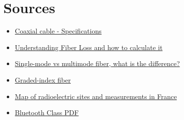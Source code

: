 \documentclass[12]{article}
\begin{document}
\newpage
\section*{Sources}

\begin{itemize}{\textwidth}
    \item [$\bullet$] \href{http://f5ad.free.fr/ANT-QSP_F5AD_Pertes-ROS-cable-coaxial.htm}{Coaxial cable - Specifications}

    \item [$\bullet$] \href{https://community.fs.com/fr/article/understanding-fiber-loss-what-is-it-and-how-to-calculate-it.html}{Understanding Fiber Loss and how to calculate it}

    \item [$\bullet$] \href{https://www.optcore.net/fr/single-mode-vs-multimode-fiber-difference/}{Single-mode vs multimode fiber, what is the difference?}

    \item [$\bullet$]\href{https://www.thefoa.org/FR/Chapitre%205.htm#:~:text=La%20fibre%20multimode%20%C3%A0%20gradient,jusqu'%C3%A0%20environ%202%20gigahertz}{Graded-index fiber}

    \item [$\bullet$] \href{https://www.cartoradio.fr}{Map of radioelectric sites and measurements in France}

    \item [$\bullet$] \href{https://www.bag.admin.ch/dam/bag/fr/dokumente/str/nis/faktenblaetter-emf/faktenblatt-bluetooth.pdf.download.pdf/faktenblatt%20bluetooth%20f.pdf}{Bluetooth Class PDF}

\end{itemize}
\end{document}
